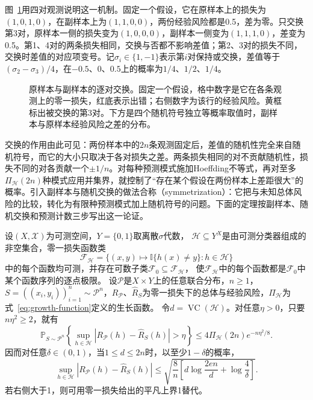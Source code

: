 图~\ref{fig:lt5-symmetrization-swap}用四对观测说明这一机制。固定一个假设，它在原样本上的损失为$(1,0,1,0)$，在副样本上为$(1,1,0,0)$，两份经验风险都是0.5，差为零。只交换第3对，原样本一侧的损失变为$(1,0,0,0)$，副样本一侧变为$(1,1,1,0)$，差变为0.5。第1、4对的两条损失相同，交换与否都不影响差值；第2、3对的损失不同，交换时差值的对应项变号。记$\sigma_i\in\{1,-1\}$表示第$i$对保持或交换，差值等于$(\sigma_2-\sigma_3)/4$，在$-0.5$、$0$、$0.5$上的概率为$1/4$、$1/2$、$1/4$。

\begin{figure}[htbp]
  \centering
  
  \caption{原样本与副样本的逐对交换。固定一个假设，格中数字是它在各条观测上的零一损失，红底表示出错；右侧数字为该行的经验风险。黄框标出被交换的第3对。下方是四个随机符号独立等概率取值时，副样本与原样本经验风险之差的分布。}
  \label{fig:lt5-symmetrization-swap}
\end{figure}

交换的作用由此可见：两份样本中的$2n$条观测固定后，差值的随机性完全来自随机符号，而它的大小只取决于各对损失之差。两条损失相同的对不贡献随机性，损失不同的对各贡献一个$\pm1/n$。对每种预测模式施加Hoeffding不等式，再对至多$\Pi_{\mathcal H}(2n)$种模式应用并集界，就控制了“存在某个假设在两份样本上差距很大”的概率。引入副样本与随机交换的做法合称（symmetrization）：它把与未知总体风险的比较，转化为有限种预测模式加上随机符号的问题。下面的定理按副样本、随机交换和预测计数三步写出这一论证。

\begin{theorem}[VC一致收敛界]
\label{thm:vc-uniform-convergence}
设$(X,\mathcal X)$为可测空间，$Y=\{0,1\}$取离散$\sigma$代数，
$\mathcal H\subseteq Y^X$是由可测分类器组成的非空集合，零一损失函数类
\[
 \mathcal F_{\mathcal H}
 =\{(x,y)\mapsto\mathbb I\{h(x)\neq y\}:h\in\mathcal H\}
\]
中的每个函数均可测，并存在可数子类$\mathcal F_0\subseteq\mathcal F_{\mathcal H}$，
使$\mathcal F_{\mathcal H}$中的每个函数都是$\mathcal F_0$中某个函数序列的逐点极限。
设$\mathcal P$是$X\times Y$上的任意联合分布，$n\geq1$，
$S=((x_i,y_i))_{i=1}^n\sim\mathcal P^n$，$R_{\mathcal P}$、$\hat R_S$为零一损失下的总体与经验风险，$\Pi_{\mathcal H}$为式~\eqref{eq:growth-function}定义的生长函数。
令$d=\operatorname{VC}(\mathcal H)$。对任意$\eta>0$，只要$n\eta^2\geq2$，就有
\begin{equation}
 \mathbb P_{S\sim\mathcal P^n}\left\{
   \sup_{h\in\mathcal H}|R_{\mathcal P}(h)-\hat R_S(h)|>\eta
 \right\}
 \leq4\Pi_{\mathcal H}(2n)e^{-n\eta^2/8}.
 \label{eq:vc-symmetrization-probability}
\end{equation}
因而对任意$\delta\in(0,1)$，当$1\leq d\leq2n$时，以至少$1-\delta$的概率，
\begin{equation}
 \sup_{h\in\mathcal H}|R_{\mathcal P}(h)-\hat R_S(h)|
 \leq
 \sqrt{\frac8n\left[
   d\log\frac{2en}{d}+\log\frac4\delta
 \right]}.
 \label{eq:vc-uniform-bound}
\end{equation}
若右侧大于1，则可用零一损失给出的平凡上界1替代。
\end{theorem}


